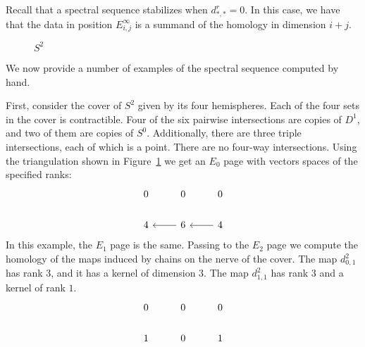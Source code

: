 Recall that a spectral sequence stabilizes when $d^r_{*,*} = 0$. In this case, we have that the data in position $E^\infty_{i,j}$ is a summand of the homology in dimension $i+j$. 
\begin{figure}
\centering
{}
\caption{$S^2$}
\label{fig:S2-triangulation}
\end{figure}
We now provide a number of examples of the spectral sequence computed by hand.
\begin{example}
First, consider the cover of $S^2$ given by its four hemispheres. Each of the four sets in the cover is contractible. Four of the six pairwise intersections are copies of $D^1$, and two of them are copies of $S^0$. Additionally, there are three triple intersections, each of which is a point. There are no four-way intersections. Using the triangulation shown in Figure~\ref{fig:S2-triangulation} we get an $E_0$ page with vectors spaces of the specified ranks:
\[ \begin{tikzcd}
0    &  0     &   0   \\
4    & \arrow{l}  6     & \arrow{l}   4
\end{tikzcd} \]
In this example, the $E_1$ page is the same.
Passing to the $E_2$ page we compute the homology of the maps induced by chains on the nerve of the cover. The map $d^2_{0,1}$ has rank 3, and it has a kernel of dimension 3. The map $d^2_{1,1}$ has rank 3 and a kernel of rank $1$.
\[ \begin{tikzcd}
0    &  0     &   0   \\
1    &  0     &   1
\end{tikzcd} \]
\end{example}

